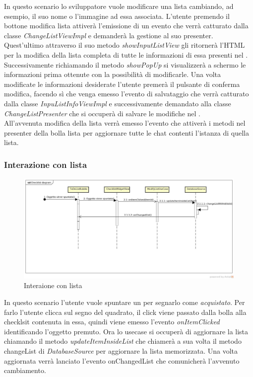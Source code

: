 In questo scenario lo sviluppatore vuole modificare una lista cambiando, ad esempio, il suo nome o l'immagine ad essa associata. L'utente premendo il bottone modifica lista attiverà l'emissione di un evento che verrà catturato dalla classe \textit{ChangeListViewImpl} e demanderà la  gestione al suo presenter. Quest'ultimo attraverso il suo  metodo \textit{showInputListView} gli ritornerà l'HTML per la modifica della lista completa di tutte le informazioni di essa presenti nel . Successivamente richiamando il metodo \textit{showPopUp} si visualizzerà a schermo  le informazioni prima ottenute con la possibilità di modificarle. Una volta modificate le informazioni desiderate l'utente premerà il pulsante di conferma modifica, facendo sì che venga emesso l'evento di salvataggio che verrà catturato dalla classe \textit{InpuListInfoViewImpl} e successivamente demandato alla classe \textit{ChangeListPresenter} che si occuperà di salvare le modifiche nel . \\
All'avvenuta modifica della lista  verrà emesso l'evento che attiverà i metodi nel presenter della bolla lista per aggiornare tutte le chat contenti l'istanza di quella lista.
 
\subsubsection{Interazione con lista }

\label{Interaione con lista}
\begin{figure}[H]
	\centering
	\includegraphics[width=\textwidth]{Sezioni/Diagrammi/img_app/Checklist_diagram.jpg}
	\caption{Interaione con lista}
\end{figure}

In questo scenario l'utente vuole spuntare un  per segnarlo come \textit{acquistato}.
Per farlo l'utente clicca sul segno del quadrato, il click viene passato dalla bolla alla checklsit contenuta in essa, quindi viene emesso l'evento \textit{onItemClicked} identificando l'oggetto premuto. Ora lo usecase si occuperà di aggiornare la lista chiamando il metodo \textit{updateItemInsideList} che chiamerà a sua volta il metodo changeList di \textit{DatabaseSource} per aggiornare la lista memorizzata. Una volta aggiornata verrà lanciato l'evento onChangedList che comunicherà l'avvenuto cambiamento.


